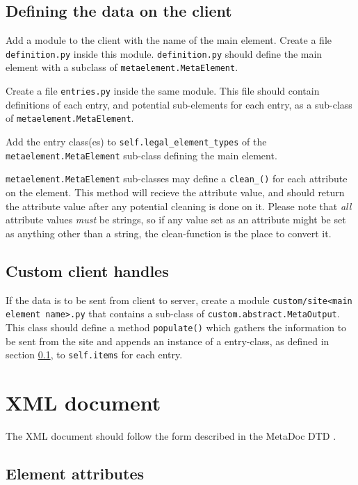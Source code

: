 \documentclass[titlepage, a4paper,10pt]{article}
\begin{document}
\subsection{Defining the data on the client}
\label{sec:defclientmodel}
Add a module to the client with the name of the main element. Create a file
\texttt{definition.py} inside this module. \texttt{definition.py} should define
the main element with a subclass of \texttt{metaelement.MetaElement}.

Create a file \texttt{entries.py} inside the same module. This file should
contain definitions of each entry, and potential sub-elements for each entry,
as a sub-class of \texttt{metaelement.MetaElement}. 

Add the entry class(es) to \texttt{self.legal\_element\_types} of the 
\texttt{metaelement.MetaElement} sub-class defining the main element. 

\texttt{metaelement.MetaElement} sub-classes may define a
\texttt{clean\_<attribute name>()} for each attribute on the element. This method
will recieve the attribute value, and should return the attribute value after
any potential cleaning is done on it. Please note that \textit{all} attribute
values \textit{must} be strings, so if any value set as an attribute might be
set as anything other than a string, the clean-function is the place to convert
it.

\subsection{Custom client handles}
If the data is to be sent from client to server, create a module
\texttt{custom/site<main element name>.py} that contains a sub-class of
\texttt{custom.abstract.MetaOutput}. This class should define a method
\texttt{populate()} which gathers the information to be sent from the site and
appends an instance of a entry-class, as defined in section
\ref{sec:defclientmodel}, to \texttt{self.items} for each entry.

\section{XML document}
\label{sec:xmldoc}

The XML document should follow the form described in the MetaDoc DTD 
\cite{metadoc_dtd}. 

\subsection{Element attributes}
\end{document}
